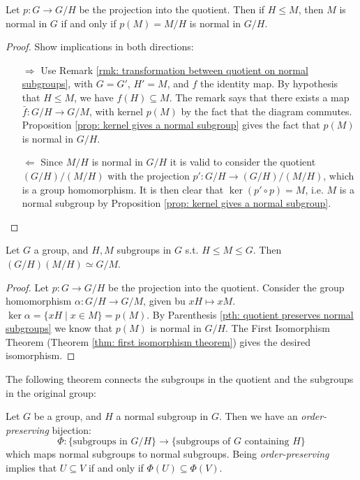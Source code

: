 \documentclass{article}
\begin{document}
\begin{parenthesis} \label{pth: quotient preserves normal subgroups}
    Let $p: G \to G/H$ be the projection into the quotient. Then if $H \leq M$, then $M$ is normal in $G$ if and only if $p(M) = M/H$ is normal in $G/H$.
\end{parenthesis}

\begin{proof}
    Show implications in both directions:
    \begin{enumerate}
        \item[$\Rightarrow$] Use Remark \ref{rmk: transformation between quotient on normal subgroups}, with $G = G'$, $H' = M$, and $f$ the identity map. By hypothesis that $H \leq M$, we have $f(H) \subseteq M$. The remark says that there exists a map $\bar{f}: G/H \to G/M$, with kernel $p(M)$ by the fact that the diagram commutes. Proposition \ref{prop: kernel gives a normal subgroup} gives the fact that $p(M)$ is normal in $G/H$.
        \item[$\Leftarrow$] Since $M/H$ is normal in $G/H$ it is valid to consider the quotient $(G/H)/(M/H)$ with the projection $p': G/H \to (G/H)/(M/H)$, which is a group homomorphism. It is then clear that $\ker (p' \circ p) = M$, i.e. $M$ is a normal subgroup by Proposition \ref{prop: kernel gives a normal subgroup}.
    \end{enumerate}
\end{proof}

\begin{theorem}
    Let $G$ a group, and $H, M$ subgroups in $G$ s.t. $H \leq M \leq G$. Then $(G/H)(M/H) \simeq G/M$.
\end{theorem}

\begin{proof}
    Let $p: G \to G/H$ be the projection into the quotient. Consider the group homomorphism $\alpha: G/H \to G/M$, given bu $xH \mapsto xM$. $\ker \alpha = \{ xH \mid x \in M \} = p(M)$. By Parenthesis \ref{pth: quotient preserves normal subgroups} we know that $p(M)$ is normal in $G/H$. The First Isomorphism Theorem (Theorem \ref{thm: first isomorphism theorem}) gives the desired isomorphism. 
\end{proof}

The following theorem connects the subgroups in the quotient and the subgroups in the original group:

\begin{theorem}[Correspondence]
    Let $G$ be a group, and $H$ a normal subgroup in $G$. Then we have an \emph{order-preserving} bijection:
    \[
        \Phi: \{ \text{subgroups in }G/H \} \to \{ \text{subgroups of $G$ containing $H$} \} 
    \]
    which maps normal subgroups to normal subgroups. Being \emph{order-preserving} implies that $U \subseteq V$ if and only if $\Phi(U) \subseteq \Phi(V)$.
\end{theorem}
\end{document}
